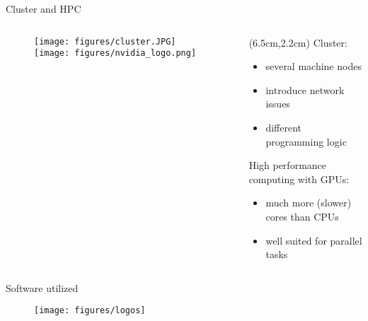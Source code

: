 \documentclass{beamer}
\begin{document}
\begin{frame}{Cluster and HPC}
 \begin{columns}
  \begin{column}{0.5\textwidth}
   \begin{figure}[h]
    \texttt{[image: figures/cluster.JPG]}
    \texttt{[image: figures/nvidia\_logo.png]}
   \end{figure}
  \end{column}
  \begin{column}{0.5\textwidth}  %
   \begin{textblock*}{10cm}(6.5cm,2.2cm)
    \footnotesize
    Cluster:
    \begin{itemize}
     \item several machine nodes
     \item introduce network issues
     \item different programming logic
    \end{itemize}
    \vspace{2.4cm}
    High performance computing with GPUs:
    \begin{itemize}
     \item much more (slower) cores than CPUs
     \item well suited for parallel tasks
    \end{itemize}
   \end{textblock*}
  \end{column}
 \end{columns}
\end{frame}


\begin{frame}{Software utilized}
 \begin{figure}[h]
  \centering
  \texttt{[image: figures/logos]}
 \end{figure}
\end{frame}
\end{document}
